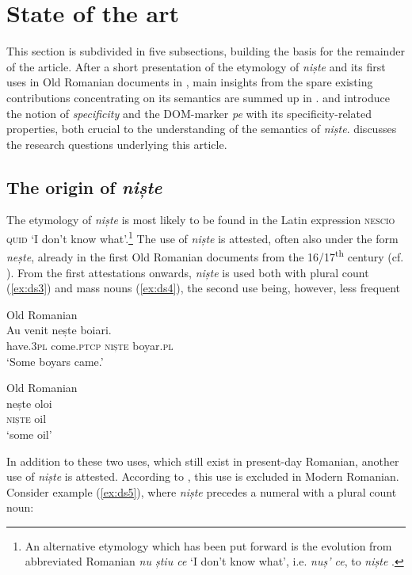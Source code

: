 \documentclass[output=paper,colorlinks,citecolor=brown]{langscibook}
\begin{document}
\section{State of the art}\label{sec:ds2}
This section is subdivided in five subsections, building the basis for the remainder of the article. After a short presentation of the etymology of \textit{niște} and its first uses in Old Romanian documents in , main insights from the spare existing contributions concentrating on its semantics are summed up in .  and  introduce the notion of \textit{specificity} and the DOM-marker \textit{pe} with its specificity-related properties, both crucial to the understanding of the semantics of \textit{niște}.  discusses the research questions underlying this article.

\subsection{The origin of \textit{niște}}\label{sec:ds2.1}
The etymology of \textit{niște} is most likely to be found in the Latin expression \textsc{nescio} \textsc{quid} `I don’t know what’.\footnote{An alternative etymology which has been put forward is the evolution from abbreviated Romanian \textit{nu știu ce} ‘I don’t know what’, i.e. \textit{nuș’ ce}, to \textit{niște} \citep[200]{Stan2006}.} The use of \textit{niște} is attested, often also under the form \textit{nește}, already in the first Old Romanian documents from the 16/17\textsuperscript{th} century (cf. \citealt{Stan2006}). From the first attestations onwards, \textit{niște} is used both with plural count (\ref{ex:ds3}) and mass nouns (\ref{ex:ds4}), the second use being, however, less frequent \citep[299, 354]{PanaDindelegan2016}

\ea\label{ex:ds3} Old Romanian \citep[299]{PanaDindelegan2016}\\
\gll Au    venit           nește boiari.\\
     have.3\textsc{pl} come.\textsc{ptcp} \textsc{niște} boyar.\textsc{pl}\\
\glt ‘Some boyars came.’ 
\z

\ea\label{ex:ds4} Old Romanian \citep[354]{PanaDindelegan2016}\\
\gll nește oloi\\
     \textsc{niște}  oil\\
\glt ‘some oil’ 
\z

In addition to these two uses, which still exist in present-day Romanian, another use of \textit{niște} is attested. According to \citet[354]{PanaDindelegan2016}, this use is excluded in Modern Romanian. Consider example (\ref{ex:ds5}), where \textit{niște} precedes a numeral with a plural count noun:
\end{document}
